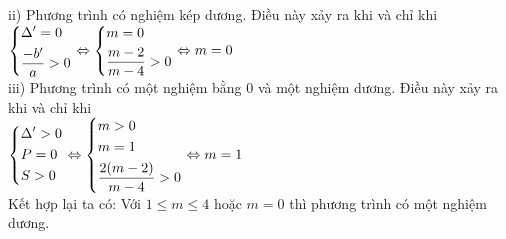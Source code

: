 \begin{ex}
{\begin{enumerate}
			ii) Phương trình có nghiệm kép dương. Điều này xảy ra khi và chỉ khi $\left\{\begin{aligned}& \Delta'=0 \\
				& \dfrac{-b'}{a}>0 
			\end{aligned}\right.\Leftrightarrow \left\{\begin{aligned}& m=0 \\
				& \dfrac{m-2}{m-4}>0 
			\end{aligned}\right.\Leftrightarrow m=0$\\
			iii) Phương trình có một nghiệm bằng 0 và một nghiệm dương. Điều này xảy ra khi và chỉ khi\\
			$\left\{\begin{aligned}& \Delta'>0 \\
				& P=0 \\
				& S>0 
			\end{aligned}\right.\Leftrightarrow \left\{\begin{aligned}& m>0 \\
				& m=1 \\
				& \dfrac{2(m-2)}{m-4}>0 
			\end{aligned}\right.\Leftrightarrow m=1$\\
			Kết hợp lại ta có: Với $1\leqslant m\leqslant 4$ hoặc $m=0$ thì phương trình có một  nghiệm dương.
			
		\end{enumerate}		
	}
\end{ex}
